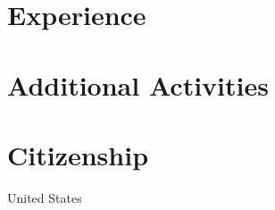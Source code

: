 \documentclass[line,margin]{res}
\begin{document}
\thispagestyle{empty}

\address{1201 West Park Street, Cedar Park, TX 78613-2801, United States}
\address{ \href{mailto:jsoltren@alum.mit.edu}{jsoltren@alum.mit.edu}
   +1 (347) 503-9558
   \url{https://www.linkedin.com/in/jsoltren}}

\begin{resume}



\section{Experience}





\newpage






\section{Additional Activities}


%
%



%







\section{Citizenship}
United States

\end{resume}
\end{document}
